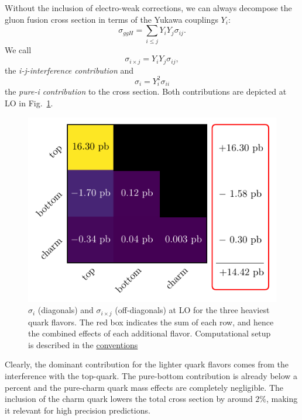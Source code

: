 Without the inclusion of electro-weak corrections, we can always decompose the gluon fusion cross section in terms of the Yukawa couplings $Y_i$:
\begin{equation}
\sigma_{ggH} =  \sum_{i\le j} Y_i Y_j \sigma_{i j}.
\end{equation}
We call
\begin{equation}
\sigma_{i \times j} = Y_i Y_j \sigma_{ij},
\end{equation}
the \textit{i-j-interference contribution} and
\begin{equation}
\sigma_{i} = Y_i^2 \sigma_{ii}
\end{equation}
the \textit{pure-i contribution} to the cross section. Both contributions are depicted at \acs{LO} in Fig.~\ref{fig:4:quark_effects}.
\begin{figure}[h]
\centering
\includegraphics[scale=0.9]{Images/quark_effects_LO.pdf}
\caption{$\sigma_{i}$ (diagonals) and $\sigma_{i \times j}$ (off-diagonals) at \acs{LO} for the three heaviest quark flavors. The red box indicates the sum of each row, and hence the combined effects of each additional flavor. Computational setup is described in the \hyperref[chap:notation_and_conventions]{conventions}}
\label{fig:4:quark_effects}
\end{figure}
Clearly, the dominant contribution for the lighter quark flavors comes from the interference with the top-quark. The pure-bottom contribution is already below a percent and the pure-charm quark mass effects are completely negligible. The inclusion of the charm quark lowers the total cross section by around $2\%$, making it relevant for high precision predictions.


